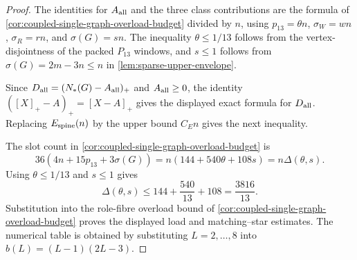 \documentclass[11pt]{article}
\begin{document}
\begin{proof}
The identities for \(A_{\rm all}\) and the three class contributions are the
formula of \cref{cor:coupled-single-graph-overload-budget} divided by \(n\),
using \(p_{13}=\theta n\), \(\sigma_W=wn\), \(\sigma_R=rn\), and
\(\sigma(G)=sn\).  The inequality \(\theta\le1/13\) follows from the
vertex-disjointness of the packed \(P_{13}\) windows, and \(s\le1\) follows
from \(\sigma(G)=2m-3n\le n\) in \cref{lem:sparse-upper-envelope}.

Since \(D_{\rm all}=(N_*(G)-A_{\rm all})_+\) and \(A_{\rm all}\ge0\), the
identity \(([X]_+-A)_+=[X-A]_+\) gives the displayed exact formula for
\(D_{\rm all}\).  Replacing \(E_{\rm spine}(n)\) by the upper bound
\(C_En\) gives the next inequality.

The slot count in \cref{cor:coupled-single-graph-overload-budget} is
\[
36(4n+15p_{13}+3\sigma(G))
=n(144+540\theta+108s)
=n\Delta(\theta,s).
\]
Using \(\theta\le1/13\) and \(s\le1\) gives
\[
\Delta(\theta,s)
\le
144+\frac{540}{13}+108
=\frac{3816}{13}.
\]
Substitution into the role-fibre overload bound of
\cref{cor:coupled-single-graph-overload-budget} proves the displayed load and
matching--star estimates.  The numerical table is obtained by substituting
\(L=2,\ldots,8\) into \(b(L)=(L-1)(2L-3)\).
\end{proof}
\end{document}
